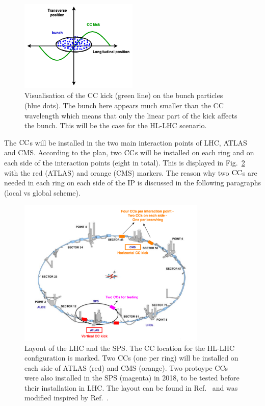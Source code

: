 \begin{figure}[!h] %
    \centering         
    \includegraphics[width=0.5\textwidth]{images/introduction/sin_CC_kick_LHC_beams.drawio.png}
        \caption{Visualisation of the CC kick (green line) on the bunch particles (blue dots). The bunch here appears much smaller than the CC wavelength which means that only the linear part of the kick affects the bunch. This will be the case for the HL-LHC scenario.}
        \label{fig:cc_simple_kick}
 \end{figure}

The ${\mathrm{CC}}$s will be installed in the two main interaction points of LHC, ATLAS and CMS. According to the plan, two ${\mathrm{CC}}$s will be installed on each ring and on each side of the interaction points (eight in total). This is displayed in Fig.~\ref{fig:LHC_layout_CCs} with the red (ATLAS) and orange (CMS) markers. The reason why two ${\mathrm{CC}}$s are needed in each ring on each side of the IP is discussed in the following paragraphs (local vs global scheme).

\begin{figure}[!h] %
    \centering         
    \includegraphics[width=0.8\textwidth]{images/introduction/LHC_layout_CCs.png}
        \caption{Layout of the LHC and the SPS. The CC location for the HL-LHC configuration is marked. Two CCs (one per ring) will be installed on each side of ATLAS (red) and CMS (orange). Two protoype CCs were also installed in the SPS (magenta) in 2018, to be tested before their installation in LHC. The layout can be found in Ref.~\cite{LHC_SPS_layout} and was modified inspired by Ref.~\cite{LHC_SPS_layout_v2}.}
        \label{fig:LHC_layout_CCs}
 \end{figure}

